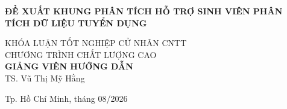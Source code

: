 \begin{titlepage}
\begin{center}
{ \Large \bfseries ĐỀ XUẤT KHUNG PHÂN TÍCH HỖ TRỢ SINH VIÊN PHÂN TÍCH DỮ LIỆU TUYỂN DỤNG\\[2cm] } 


\large KHÓA LUẬN TỐT NGHIỆP CỬ NHÂN CNTT\\
\large CHƯƠNG TRÌNH CHẤT LƯỢNG CAO\\[2cm]

\textbf{GIẢNG VIÊN HƯỚNG DẪN}\\
TS. Vũ Thị Mỹ Hằng


\vfill
Tp. Hồ Chí Minh, tháng 08/2026

\end{center}
\end{titlepage}
